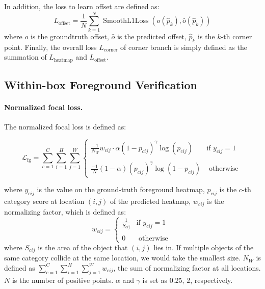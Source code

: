 \documentclass{article}
\begin{document}
In addition, the loss to learn offset are defined as:
\begin{equation}
    L_{\text{offset}}=\frac{1}{N} \sum_{k=1}^{N} \operatorname{SmoothL1Loss}\left(o(\hat{p}_k), \hat{o}(\hat{p}_k)\right)
\end{equation}
where $o$ is the groundtruth offset, $\hat{o}$ is the predicted offset, $\hat{p}_k$ is the $k$-th corner point. Finally, the overall loss $L_{\text{corner}}$ of corner branch is simply defined as the summation of $L_{\text {heatmap}}$ and $L_{\text{offset}}$.

\subsection{Within-box Foreground Verification}

\paragraph{Normalized focal loss.} The normalized focal loss is defined as:

\begin{equation}
    \mathcal{L}_{\text{fg}}=\sum_{c=1}^C\sum_{i=1}^{H} \sum_{j=1}^{W}\left\{\begin{array}{cc}
\frac{-1}{N_W} w_{cij} \cdot \alpha \left(1-p_{cij}\right)^\gamma\log \left(p_{cij}\right)& \text {if $y_{cij}=1$}\\
\\
\frac{-1}{N}\left(1-\alpha\right)\left(p_{cij}\right)^\gamma\log\left(1-p_{cij}\right) & \text { otherwise }
\end{array}\right.  
\end{equation}

where $y_{cij}$ is the value on the ground-truth foreground heatmap, $p_{cij}$ is the $c$-th category score at location $(i,j)$ of the predicted heatmap, $w_{cij}$ is the normalizing factor, which is defined as:
\begin{equation}
    w_{cij}=\left\{\begin{array}{cc}
\frac{1}{S_{cij}}& \text {if $y_{cij}=1$}\\
\\
0 & \text { otherwise }
\end{array}\right. 
\end{equation}
where $S_{cij}$ is the area of the object that $(i,j)$ lies in. If multiple objects of the same category collide at the same location, we would take the smallest size. $N_W$ is defined as $\sum\limits_{c=1}^C\sum\limits_{i=1}^{H} \sum\limits_{j=1}^{W} w_{cij}$, the sum of normalizing factor at all locations. $N$ is the number of positive points. $\alpha$ and $\gamma$ is set as 0.25, 2, respectively.
\end{document}
